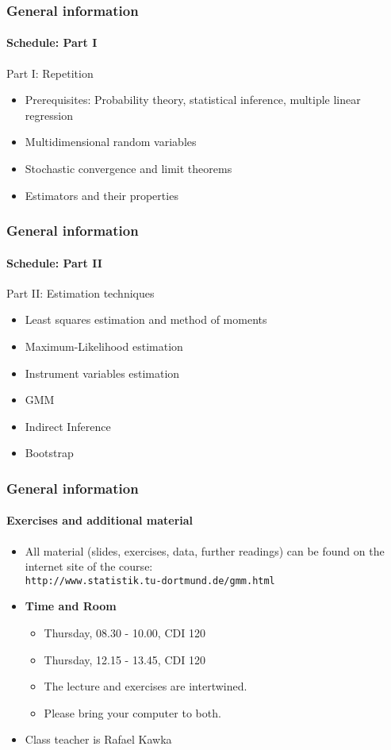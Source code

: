\documentclass[notes=show]{beamer}
\begin{document}
\begin{frame}\frametitle{General information}\framesubtitle{Schedule: Part I}
Part I: Repetition
    \begin{itemize}
        \item Prerequisites: Probability theory, statistical inference, multiple linear regression
        \item Multidimensional random variables
        \item Stochastic convergence and limit theorems
        \item Estimators and their properties
    \end{itemize}
\end{frame}


\begin{frame}\frametitle{General information}\framesubtitle{Schedule: Part II}
Part II: Estimation techniques
    \begin{itemize}
        \item Least squares estimation and method of moments
        \item Maximum-Likelihood estimation
        \item Instrument variables estimation
        \item GMM
        \item Indirect Inference
        \item Bootstrap
    \end{itemize}
\end{frame}


\begin{frame}\frametitle{General information}\framesubtitle{Exercises and additional material}
    \begin{itemize}
    \item All material (slides, exercises, data, further readings) can be found on the internet site of the course:\\
        \texttt{http://www.statistik.tu-dortmund.de/gmm.html}
    \item \textbf{Time and Room}
    \begin{itemize}
        \item Thursday, 08.30 - 10.00, CDI 120
        \item Thursday, 12.15 - 13.45, CDI 120
        \item The lecture and exercises are intertwined.
        \item Please bring your computer to both.
    \end{itemize}
    \item Class teacher is Rafael Kawka
    \end{itemize}
\end{frame}
\end{document}
